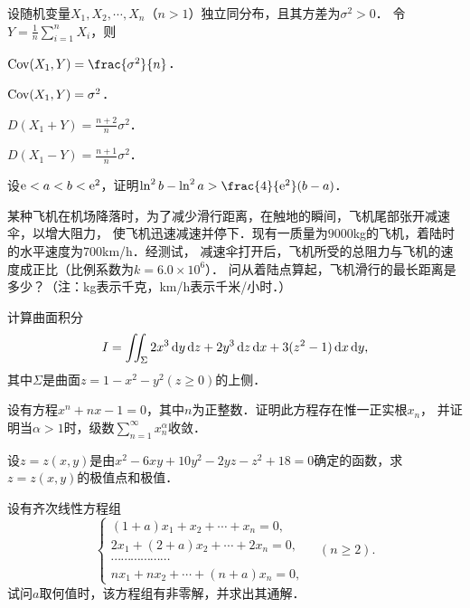 \documentclass[plain,noanswer,medmath]{../../template/jnuexam}
\begin{document}
\begin{problem}
设随机变量$X_1,X_2, \cdots ,X_n$（$n > 1$）独立同分布，且其方差为$\sigma^2 > 0$．
令$Y = \frac{1}{n}\sum_{i = 1}^n X_i$，则\pickout{}
\begin{abcd}
\item $\Cov (X_1,Y) = \frac{\sigma^2}{n}$．
\item $\operatorname{Cov} (X_1,Y) = \sigma^2$．
\item $D(X_1 + Y) = \frac{n + 2}{n} \sigma^2$．
\item $D(X_1 - Y) = \frac{n + 1}{n} \sigma^2$．
\end{abcd}
\end{problem}




\begin{problem}[points=12]
设$\mathrm{e} < a < b < \mathrm{e}^2$，证明$\ln^2 b - \ln^2 a > \frac{4}{\e^2}(b - a)$．
\end{problem}


\begin{problem}[points=11]
某种飞机在机场降落时，为了减少滑行距离，在触地的瞬间，飞机尾部张开减速伞，以增大阻力，
使飞机迅速减速并停下．现有一质量为$9000$kg的飞机，着陆时的水平速度为$700$km/h．经测试，
减速伞打开后，飞机所受的总阻力与飞机的速度成正比（比例系数为$k = 6.0 \times 10^6$）．
问从着陆点算起，飞机滑行的最长距离是多少？（注：kg表示千克，km/h表示千米/小时．）
\end{problem}


\begin{problem}[points=12]
计算曲面积分
$$I = \iint_{\Sigma}2x^3 \mathop{}\!\mathrm{d} y\mathop{}\!\mathrm{d} z + 2y^3 \mathop{}\!\mathrm{d} z\mathop{}\!\mathrm{d} x + 3(z^2 - 1) \mathop{}\!\mathrm{d} x\mathop{}\!\mathrm{d} y,$$
其中$\Sigma$是曲面$z = 1 - x^2 - y^2(z \ge 0)$的上侧．
\end{problem}


\begin{problem}[points=11]
设有方程$x^n + nx - 1 = 0$，其中$n$为正整数．证明此方程存在惟一正实根$x_n$，
并证明当$\alpha > 1$时，级数$\sum_{n = 1}^{\infty}x_n^{\alpha}$收敛．
\end{problem}


\begin{problem}[points=12]
设$z = z(x,y)$是由$x^2 - 6xy + 10y^2 - 2yz - z^2 + 18 = 0$确定的函数，求$z = z(x,y)$的极值点和极值．
\end{problem}


\begin{problem}[points=9]
设有齐次线性方程组
$$\begin{cases}
  (1 + a) x_1 + x_2 + \cdots + x_n = 0, \\
  2x_1 + (2 + a) x_2 + \cdots + 2x_n = 0, \\
  \cdots \cdots \cdots \cdots \cdots \cdots \\
  nx_1 + nx_2 + \cdots + (n + a) x_n = 0,
\end{cases}\quad(n \ge 2).$$
试问$a$取何值时，该方程组有非零解，并求出其通解．
\end{problem}
\end{document}
